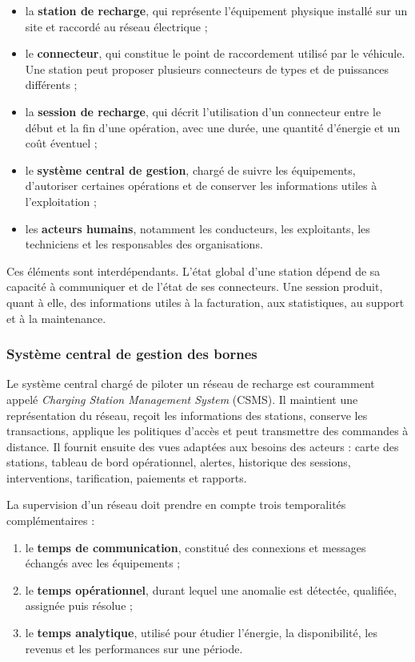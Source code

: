 \begin{itemize}[leftmargin=7mm]
  \item la \textbf{station de recharge}, qui représente l'équipement physique installé
  sur un site et raccordé au réseau électrique ;
  \item le \textbf{connecteur}, qui constitue le point de raccordement utilisé par le
  véhicule. Une station peut proposer plusieurs connecteurs de types et de puissances
  différents ;
  \item la \textbf{session de recharge}, qui décrit l'utilisation d'un connecteur entre
  le début et la fin d'une opération, avec une durée, une quantité d'énergie et un
  coût éventuel ;
  \item le \textbf{système central de gestion}, chargé de suivre les équipements,
  d'autoriser certaines opérations et de conserver les informations utiles à
  l'exploitation ;
  \item les \textbf{acteurs humains}, notamment les conducteurs, les exploitants, les
  techniciens et les responsables des organisations.
\end{itemize}

Ces éléments sont interdépendants. L'état global d'une station dépend de sa capacité
à communiquer et de l'état de ses connecteurs. Une session produit, quant à elle, des
informations utiles à la facturation, aux statistiques, au support et à la maintenance.

\subsubsection{Système central de gestion des bornes}

Le système central chargé de piloter un réseau de recharge est couramment appelé
\emph{Charging Station Management System} (CSMS). Il maintient une représentation
du réseau, reçoit les informations des stations, conserve les transactions, applique
les politiques d'accès et peut transmettre des commandes à distance. Il fournit
ensuite des vues adaptées aux besoins des acteurs : carte des stations, tableau de
bord opérationnel, alertes, historique des sessions, interventions, tarification,
paiements et rapports.

La supervision d'un réseau doit prendre en compte trois temporalités complémentaires :

\begin{enumerate}[leftmargin=8mm]
  \item le \textbf{temps de communication}, constitué des connexions et messages
  échangés avec les équipements ;
  \item le \textbf{temps opérationnel}, durant lequel une anomalie est détectée,
  qualifiée, assignée puis résolue ;
  \item le \textbf{temps analytique}, utilisé pour étudier l'énergie, la disponibilité,
  les revenus et les performances sur une période.
\end{enumerate}

